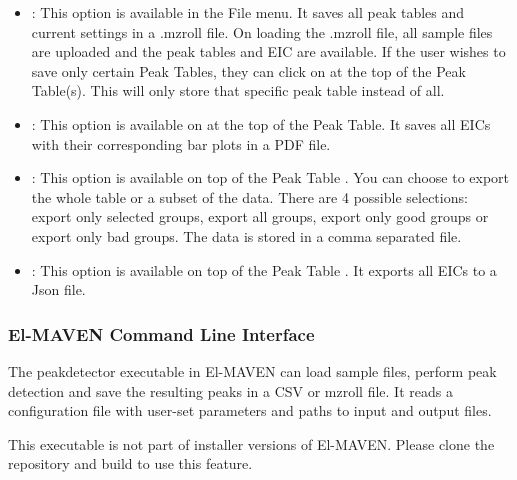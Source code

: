 \documentclass[letterpaper,10pt,english,openany,oneside]{sphinxmanual}
\begin{document}
\begin{itemize}
\item {} 
: This option is available in the File menu. It saves all peak tables and current settings in a .mzroll file. On loading the .mzroll file, all sample files are uploaded and the peak tables and EIC are available. If the user wishes to save only certain Peak Tables, they can click on  at the top of the Peak Table(s). This will only store that specific peak table instead of all.

\item {} 
: This option is available on  at the top of the Peak Table. It saves all EICs with their corresponding bar plots in a PDF file.

\item {} 
: This option is available on top of the Peak Table . You can choose to export the whole table or a subset of the data. There are 4 possible selections: export only selected groups, export all groups, export only good groups or export only bad groups. The data is stored in a comma separated file.

\end{itemize}

\begin{itemize}
\item {} 
: This option is available on top of the Peak Table . It exports all EICs to a Json file.

\end{itemize}


\subsubsection{El-MAVEN Command Line Interface}
\label{\detokenize{IntroductiontoElMAVENCLI:el-maven-command-line-interface}}\label{\detokenize{IntroductiontoElMAVENCLI::doc}}
The peakdetector executable in El-MAVEN can load sample files, perform peak detection and save the resulting peaks in a CSV or mzroll file. It reads a configuration file with user-set parameters and paths to input and output files.

This executable is not part of installer versions of El-MAVEN. Please clone the repository and build  to use this feature.
\end{document}
